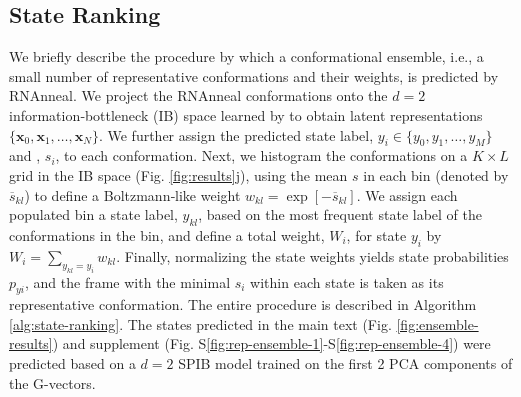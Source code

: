 \documentclass[%
aip,
 amsmath,amssymb,
reprint,%
twocolumn,
]{revtex4-1}
\makeatletter
\newcommand\setcurrentname[1]{\def\@currentlabelname{#1}}
\makeatother
\begin{document}
{\subsection*{State Ranking}
       \setcurrentname{State Ranking}
\label{methods:state-ranking}

We briefly describe the procedure by which a conformational ensemble, i.e., a small number of representative conformations and their weights, is predicted by RNAnneal. We project the RNAnneal conformations onto the $d=2$ information‑bottleneck (IB) space learned by  to obtain latent representations $\{\mathbf{x}_0,\mathbf{x}_1,\ldots,\mathbf{x}_N\}$. We further assign the predicted state label, $y_i \in \{y_0,y_1,\ldots,y_M \}$ and , $s_i$, to each conformation. Next, we histogram the conformations on a $K \times L$ grid in the IB space (Fig. \ref{fig:results}j), using the mean $s$ in each bin (denoted by $\overline{{s}}_{kl}$) to define a Boltzmann‑like weight
$w_{kl} = \exp[{-\overline{{s}}_{kl}}]$. We assign each populated bin a state label, $y_{kl}$, based on the most frequent state label of the conformations in the bin, and define a total weight, $W_i$, for state $y_i$ by $W_i = \sum_{y_{kl}=y_i} w_{kl}$. Finally, normalizing the state weights yields state probabilities $p_{yi}$, and the frame with the minimal $s_i$ within each state is taken as its representative conformation. The entire procedure is described in Algorithm \ref{alg:state-ranking}. The states predicted in the main text (Fig. \ref{fig:ensemble-results}) and supplement (Fig. S\ref{fig:rep-ensemble-1}-S\ref{fig:rep-ensemble-4}) were predicted based on a $d=2$ SPIB model trained on the first 2 PCA components of the G-vectors. 


}
\end{document}
